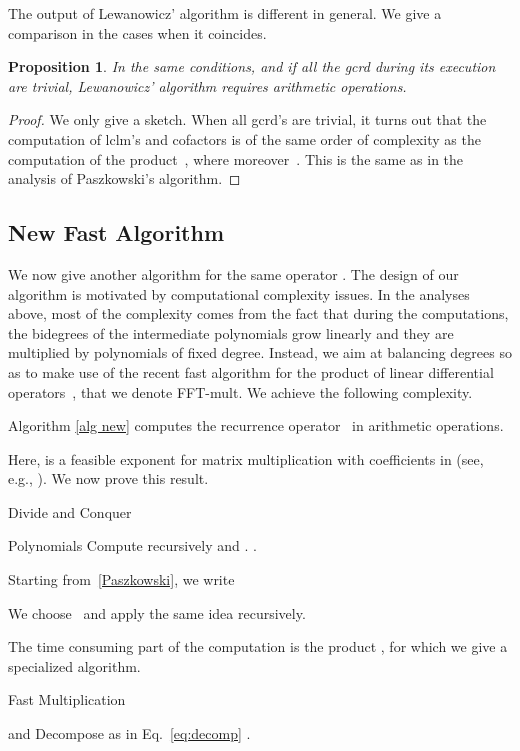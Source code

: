 \documentclass{amsart}
\newtheorem{prop}{Proposition}
\theoremstyle{definition}
\begin{document}
The output of Lewanowicz' algorithm is different in general. We give a comparison in the cases when it coincides.
\begin{prop}In the same conditions, and if all the gcrd during its execution are trivial, Lewanowicz' algorithm requires 
 arithmetic operations.
\end{prop}
\begin{proof}
We only give a sketch. When all gcrd's are trivial, it turns out that the computation of lclm's and cofactors is of the same order of complexity as the computation of the product~, where moreover~. This is the same as in the analysis of Paszkowski's algorithm.
\end{proof}


\subsection{New Fast Algorithm}
We now give another algorithm for the same operator . The design of our algorithm is motivated by computational complexity issues. In the  analyses above, most of the complexity comes from the fact that during the computations, the bidegrees of the intermediate polynomials grow linearly and they are multiplied by polynomials of fixed degree. Instead, we aim at balancing degrees so as to make use of the recent fast algorithm for the product of linear differential operators~\cite{FFTjoris,BoChLR08}, that we denote FFT-mult. We achieve the following complexity.


\begin{theo}\label{complexity}
Algorithm \ref{alg new} computes the recurrence operator~ in  arithmetic operations. 
\end{theo}
Here,  is a feasible exponent for matrix multiplication with coefficients in  (see, e.g., \cite{GathenGerhard1999}). We now prove this result.
\begin{algorithm}
	\caption{Divide and Conquer}
	\label{alg new}
	\begin{algorithmic}
		\REQUIRE Polynomials 
		\ENSURE 
		\IF {} \RETURN 
		\ELSE
			\STATE 
			\STATE Compute recursively  and .
			\RETURN .
		\ENDIF
	\end{algorithmic}
\end{algorithm}  

Starting from~\eqref{Paszkowski}, we write

We choose~ and apply the same idea recursively.

The time consuming part of the computation is the product , for which we give a specialized algorithm.
\begin{algorithm}
	\caption{Fast Multiplication\label{fast-mult}}
	\label{mult}
	\begin{algorithmic}
		\REQUIRE  and 
		\ENSURE 
		\STATE Decompose  as in Eq.~\eqref{eq:decomp}
		\STATE 
		\FORALL{ from 0 to }
			\STATE 
		\ENDFOR
		\RETURN .
	\end{algorithmic}
\end{algorithm}
\end{document}
